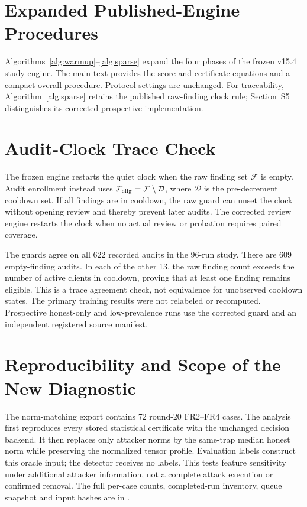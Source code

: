 \documentclass[journal]{IEEEtran}
\begin{document}
\section{Expanded Published-Engine Procedures}
Algorithms~\ref{alg:warmup}--\ref{alg:sparse} expand the four phases
of the frozen v15.4 study engine. The main text provides the score and
certificate equations and a compact overall procedure. Protocol settings
are unchanged. For traceability, Algorithm~\ref{alg:sparse} retains the
published raw-finding clock rule; Section~S5 distinguishes its corrected
prospective implementation.

\FloatBarrier

\section{Audit-Clock Trace Check}\label{app:audit-clock}
The frozen engine restarts the quiet clock when the raw finding set
$\mathcal F$ is empty. Audit enrollment instead uses
$\mathcal F_{\rm elig}=\mathcal F\setminus\mathcal D$, where $\mathcal D$
is the pre-decrement cooldown set. If all findings are in cooldown,
the raw guard can unset the clock without opening review and thereby
prevent later audits. The corrected review engine restarts the clock
when no actual review or probation requires paired coverage.

The guards agree on all 622 recorded audits in the 96-run study.
There are 609 empty-finding audits. In each of the other 13, the raw
finding count exceeds the number of active clients in cooldown, proving
that at least one finding remains eligible. This is a trace agreement
check, not equivalence for unobserved cooldown states. The primary
training results were not relabeled or recomputed. Prospective honest-only
and low-prevalence runs use the corrected guard and an independent
registered source manifest.

\section{Reproducibility and Scope of the New Diagnostic}
The norm-matching export contains 72 round-20 FR2--FR4 cases. The analysis
first reproduces every stored statistical certificate with the unchanged
decision backend. It then replaces only attacker norms by the same-trap
median honest norm while preserving the normalized tensor profile.
Evaluation labels construct this oracle input; the detector receives no
labels. This tests feature sensitivity under additional attacker
information, not a complete attack execution or confirmed removal.
The full per-case counts, completed-run inventory, queue snapshot and
input hashes are in .



\end{document}
